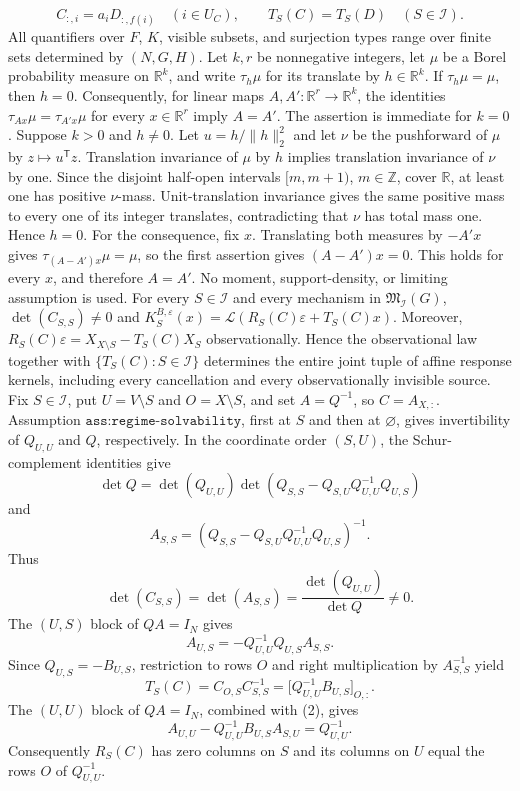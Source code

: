 \[
C_{:,i}=a_iD_{:,f(i)}\quad(i\in U_C),
\qquad
T_S(C)=T_S(D)\quad(S\in\mathcal I).
\]
All quantifiers over \(F\), \(K\), visible subsets, and surjection types range over finite sets determined by \((N,G,H)\).
Let \(k,r\) be nonnegative integers, let \(\mu\) be a Borel probability measure on \(\mathbb R^k\), and write \(\tau_h\mu\) for its translate by \(h\in\mathbb R^k\). If \(\tau_h\mu=\mu\), then \(h=0\). Consequently, for linear maps \(A,A':\mathbb R^r\to\mathbb R^k\), the identities \(\tau_{Ax}\mu=\tau_{A'x}\mu\) for every \(x\in\mathbb R^r\) imply \(A=A'\).
The assertion is immediate for \(k=0\). Suppose \(k>0\) and \(h\ne0\). Let \(u=h/\lVert h\rVert_2^2\) and let \(\nu\) be the pushforward of \(\mu\) by \(z\mapsto u^{\mathsf T}z\). Translation invariance of \(\mu\) by \(h\) implies translation invariance of \(\nu\) by one. Since the disjoint half-open intervals \([m,m+1)\), \(m\in\mathbb Z\), cover \(\mathbb R\), at least one has positive \(\nu\)-mass. Unit-translation invariance gives the same positive mass to every one of its integer translates, contradicting that \(\nu\) has total mass one. Hence \(h=0\). For the consequence, fix \(x\). Translating both measures by \(-A'x\) gives \(\tau_{(A-A')x}\mu=\mu\), so the first assertion gives \((A-A')x=0\). This holds for every \(x\), and therefore \(A=A'\). No moment, support-density, or limiting assumption is used.
For every \(S\in\mathcal I\) and every mechanism in \(\mathfrak M_{\mathcal I}(G)\), \(\det(C_{S,S})\ne0\) and \(K_S^{B,\varepsilon}(x)=\mathcal L(R_S(C)\varepsilon+T_S(C)x)\). Moreover, \(R_S(C)\varepsilon=X_{X\setminus S}-T_S(C)X_S\) observationally. Hence the observational law together with \(\{T_S(C):S\in\mathcal I\}\) determines the entire joint tuple of affine response kernels, including every cancellation and every observationally invisible source.
Fix \(S\in\mathcal I\), put \(U=V\setminus S\) and \(O=X\setminus S\), and set \(A=Q^{-1}\), so \(C=A_{X,:}\). Assumption \(\texttt{ass:regime-solvability}\), first at \(S\) and then at \(\varnothing\), gives invertibility of \(Q_{U,U}\) and \(Q\), respectively. In the coordinate order \((S,U)\), the Schur-complement identities give
\[
\det Q=\det(Q_{U,U})\det\!\left(Q_{S,S}-Q_{S,U}Q_{U,U}^{-1}Q_{U,S}\right)
\]
and
\[
A_{S,S}=\left(Q_{S,S}-Q_{S,U}Q_{U,U}^{-1}Q_{U,S}\right)^{-1}.
\]
Thus
\[
\det(C_{S,S})=\det(A_{S,S})=\frac{\det(Q_{U,U})}{\det Q}\ne0. \tag{1}
\]
The \((U,S)\) block of \(QA=I_N\) gives
\[
A_{U,S}=-Q_{U,U}^{-1}Q_{U,S}A_{S,S}.
\]
Since \(Q_{U,S}=-B_{U,S}\), restriction to rows \(O\) and right multiplication by \(A_{S,S}^{-1}\) yield
\[
T_S(C)=C_{O,S}C_{S,S}^{-1}=\bigl[Q_{U,U}^{-1}B_{U,S}\bigr]_{O,:}. \tag{2}
\]
The \((U,U)\) block of \(QA=I_N\), combined with (2), gives
\[
A_{U,U}-Q_{U,U}^{-1}B_{U,S}A_{S,U}=Q_{U,U}^{-1}.
\]
Consequently \(R_S(C)\) has zero columns on \(S\) and its columns on \(U\) equal the rows \(O\) of \(Q_{U,U}^{-1}\).

